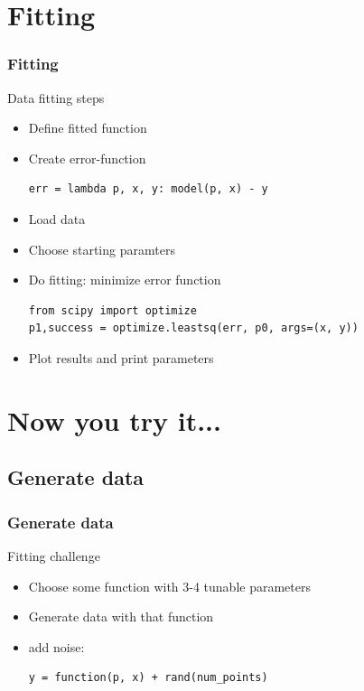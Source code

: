 \documentclass{beamer}
\begin{document}
\section{Fitting}
\begin{frame}[fragile]
  \frametitle{Fitting}
  \begin{block}{Data fitting steps}
	 \begin{itemize}[<+->]
		 \item Define fitted function
		 \item Create error-function
\begin{lstlisting}
err = lambda p, x, y: model(p, x) - y
\end{lstlisting}
		 \item Load data
		 \item Choose starting paramters
		 \item Do fitting: minimize error function
\begin{lstlisting}
from scipy import optimize
p1,success = optimize.leastsq(err, p0, args=(x, y))
\end{lstlisting}
		 \item Plot results and print parameters
	 \end{itemize}
  \end{block}
\end{frame}


\section{Now you try it...}
\subsection{Generate data}
\begin{frame}[fragile]
  \frametitle{Generate data}
  \begin{block}{Fitting challenge}
	 \begin{itemize}[<+->]
		 \item Choose some function with 3-4 tunable parameters
		 \item Generate data with that function
		 \item add noise: 
\begin{lstlisting}
y = function(p, x) + rand(num_points)
\end{lstlisting}
	 \end{itemize}
  \end{block}
\end{frame}
\end{document}
